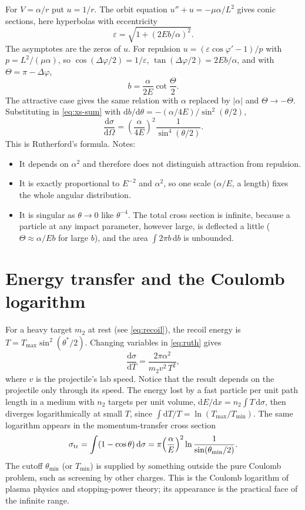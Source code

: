 \documentclass[11pt,a4paper]{book}
\numberwithin{equation}{chapter}
\newcommand{\dd}{\mathrm{d}}
\newcommand{\dsdO}{\frac{\dd\sigma}{\dd\Omega}}
\begin{document}
For $V=\alpha/r$ put $u=1/r$. The orbit equation $u''+u=-\mu\alpha/L^2$ gives
conic sections, here hyperbolas with eccentricity
\[
  \varepsilon=\sqrt{1+(2Eb/\alpha)^2}.
\]
The asymptotes are the zeros of $u$. For repulsion
$u=(\varepsilon\cos\varphi'-1)/p$ with $p=L^2/(\mu\alpha)$, so
$\cos(\Delta\varphi/2)=1/\varepsilon$, $\tan(\Delta\varphi/2)=2Eb/\alpha$, and
with $\Theta=\pi-\Delta\varphi$,
\begin{equation}\label{eq:b-ruth}
  b=\frac{\alpha}{2E}\cot\frac\Theta2 .
\end{equation}
The attractive case gives the same relation with $\alpha$ replaced by
$|\alpha|$ and $\Theta\to-\Theta$. Substituting in \eqref{eq:xs-sum} with
$\dd b/\dd\theta=-(\alpha/4E)/\sin^2(\theta/2)$,
\begin{equation}\label{eq:ruth}
  \dsdO=\left(\frac{\alpha}{4E}\right)^{2}\frac1{\sin^4(\theta/2)} .
\end{equation}
This is Rutherford's formula. Notes:
\begin{itemize}
  \item It depends on $\alpha^2$ and therefore does not distinguish attraction
        from repulsion.
  \item It is exactly proportional to $E^{-2}$ and $\alpha^2$, so one scale
        ($\alpha/E$, a length) fixes the whole angular distribution.
  \item It is singular as $\theta\to0$ like $\theta^{-4}$. The total cross
        section is infinite, because a particle at any impact parameter,
        however large, is deflected a little ($\Theta\approx\alpha/Eb$ for
        large $b$), and the area $\int2\pi b\,\dd b$ is unbounded.
\end{itemize}

\section{Energy transfer and the Coulomb logarithm}\label{sec:coullog}

For a heavy target $m_2$ at rest (see \eqref{eq:recoil}), the recoil energy is
$T=T_{\max}\sin^2(\theta^*/2)$. Changing variables in \eqref{eq:ruth} gives
\begin{equation}\label{eq:dsdT}
  \frac{\dd\sigma}{\dd T}=\frac{2\pi\alpha^2}{m_2v^2\,T^2},
\end{equation}
where $v$ is the projectile's lab speed. Notice that the result depends on the
projectile only through its speed. The energy lost by a fast particle per unit
path length in a medium with $n_2$ targets per unit volume,
$\dd E/\dd x=n_2\!\int T\,\dd\sigma$, then diverges logarithmically at small
$T$, since $\int\dd T/T=\ln(T_{\max}/T_{\min})$. The same logarithm appears in
the momentum-transfer cross section
\begin{equation}\label{eq:sigtr}
  \sigma_{\mathrm{tr}}=\int(1-\cos\theta)\,\dd\sigma
  =\pi\Bigl(\frac\alpha E\Bigr)^{2}\ln\frac{1}{\sin(\theta_{\min}/2)} .
\end{equation}
The cutoff $\theta_{\min}$ (or $T_{\min}$) is supplied by something outside the
pure Coulomb problem, such as screening by other charges. This is the Coulomb
logarithm of plasma physics and stopping-power theory; its appearance is the
practical face of the infinite range.
\end{document}
